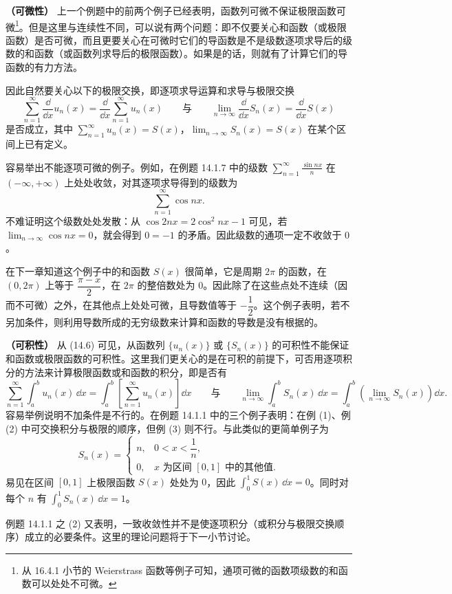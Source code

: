\begin{xexample}[14.2.2]
\textbf{（可微性）} 上一个例题中的前两个例子已经表明，函数列可微不保证极限函数可微\footnote{从 16.4.1 小节的 Weierstrass 函数等例子可知，通项可微的函数项级数的和函数可以处处不可微。}。但是这里与连续性不同，可以说有两个问题：即不仅要关心和函数（或极限函数）是否可微，而且更要关心在可微时它们的导函数是不是级数逐项求导后的级数的和函数（或函数列求导后的极限函数）。如果是的话，则就有了计算它们的导函数的有力方法。

因此自然要关心以下的极限交换，即逐项求导运算和求导与极限交换
\[
  \sum_{n=1}^{\infty}\frac{\dd}{\dd x}u_n(x)=\frac{\dd}{\dd x}\sum_{n=1}^{\infty}u_n(x)
  \qquad\text{与}\qquad
  \lim_{n\to\infty}\frac{\dd}{\dd x}S_n(x)=\frac{\dd}{\dd x}S(x)
\]
是否成立，其中 $\displaystyle\sum_{n=1}^{\infty}u_n(x)=S(x)$，$\displaystyle\lim_{n\to\infty}S_n(x)=S(x)$ 在某个区间上已有定义。

容易举出不能逐项可微的例子。例如，在例题 14.1.7 中的级数 $\displaystyle\sum_{n=1}^{\infty}\frac{\sin nx}{n}$ 在 $(-\infty,+\infty)$ 上处处收敛，对其逐项求导得到的级数为
\[
  \sum_{n=1}^{\infty}\cos nx.
\]
不难证明这个级数处处发散：从 $\cos2nx=2\cos^2nx-1$ 可见，若 $\displaystyle\lim_{n\to\infty}\cos nx=0$，就会得到 $0=-1$ 的矛盾。因此级数的通项一定不收敛于 $0$。

在下一章知道这个例子中的和函数 $S(x)$ 很简单，它是周期 $2\pi$ 的函数，在 $(0,2\pi)$ 上等于 $\dfrac{\pi-x}{2}$，在 $2\pi$ 的整倍数处为 $0$。因此除了在这些点处不连续（因而不可微）之外，在其他点上处处可微，且导数值等于 $-\dfrac12$。这个例子表明，若不另加条件，则利用导数所成的无穷级数来计算和函数的导数是没有根据的。
\end{xexample}

\begin{xexample}[14.2.3]
\textbf{（可积性）} 从 (14.6) 可见，从函数列 $\{u_n(x)\}$ 或 $\{S_n(x)\}$ 的可积性不能保证和函数或极限函数的可积性。这里我们更关心的是在可积的前提下，可否用逐项积分的方法来计算极限函数或和函数的积分，即是否有
\[
  \sum_{n=1}^{\infty}\int_a^b u_n(x)\,\dd x
  =\int_a^b\left[\sum_{n=1}^{\infty}u_n(x)\right]\dd x
  \qquad\text{与}\qquad
  \lim_{n\to\infty}\int_a^b S_n(x)\,\dd x
  =\int_a^b\left(\lim_{n\to\infty}S_n(x)\right)\dd x.
\]
容易举例说明不加条件是不行的。在例题 14.1.1 中的三个例子表明：在例 (1)、例 (2) 中可交换积分与极限的顺序，但例 (3) 则不行。与此类似的更简单例子为
\begin{equation}
  S_n(x)=
  \begin{cases}
    n,&0<x<\dfrac1n,\\
    0,&x\text{ 为区间 }[0,1]\text{ 中的其他值}.
  \end{cases}
  \tag{14.7}
  \label{eq:14.7}
\end{equation}
易见在区间 $[0,1]$ 上极限函数 $S(x)$ 处处为 $0$，因此 $\displaystyle\int_0^1S(x)\,\dd x=0$。同时对每个 $n$ 有 $\displaystyle\int_0^1S_n(x)\,\dd x=1$。

例题 14.1.1 之 (2) 又表明，一致收敛性并不是使逐项积分（或积分与极限交换顺序）成立的必要条件。这里的理论问题将于下一小节讨论。
\end{xexample}

